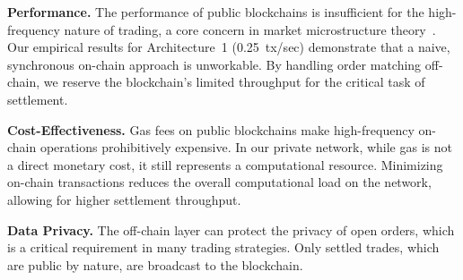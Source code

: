 \textbf{Performance.} The performance of public blockchains is insufficient for the high-frequency nature of trading, a core concern in market microstructure theory~\cite{ohara1995market}. Our empirical results for Architecture~1 (0.25~tx/sec) demonstrate that a naive, synchronous on-chain approach is unworkable. By handling order matching off-chain, we reserve the blockchain's limited throughput for the critical task of settlement.

\textbf{Cost-Effectiveness.} Gas fees on public blockchains make high-frequency on-chain operations prohibitively expensive. In our private network, while gas is not a direct monetary cost, it still represents a computational resource. Minimizing on-chain transactions reduces the overall computational load on the network, allowing for higher settlement throughput.

\textbf{Data Privacy.} The off-chain layer can protect the privacy of open orders, which is a critical requirement in many trading strategies. Only settled trades, which are public by nature, are broadcast to the blockchain.
